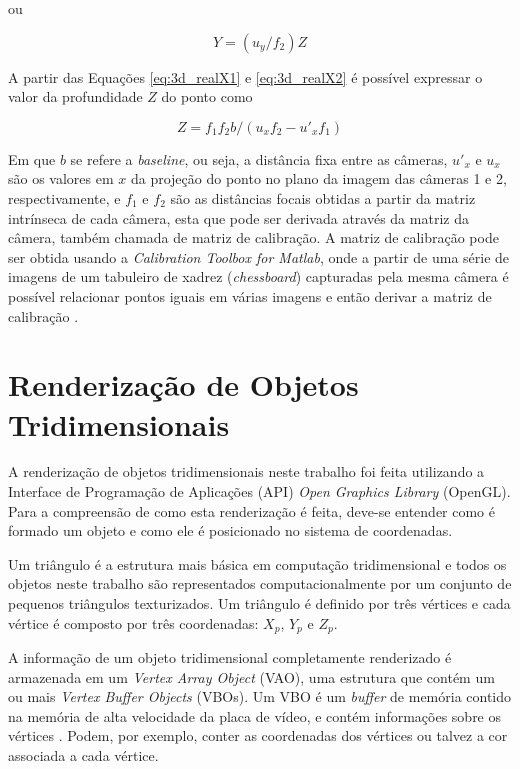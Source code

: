 {ou

\begin{equation}
Y = (u_y/f_2) Z
\label{eq:3d_realY2}
\end{equation}  


A partir das Equações \ref{eq:3d_realX1} e \ref{eq:3d_realX2} é possível expressar o valor da profundidade $Z$ do ponto como

\begin{equation}
Z = f_1  f_2  b / (u_x  f_2 - u'_x  f_1)
\label{eq:3d_Zequation}
\end{equation}


Em que $b$ se refere a \textit{baseline}, ou seja, a distância fixa entre as câmeras, $u'_x$ e $u_x$ são os valores em $x$ da projeção do ponto no plano da imagem das câmeras 1 e 2, respectivamente, e $f_1$ e $f_2$ são as distâncias focais obtidas a partir da matriz intrínseca de cada câmera, esta que pode ser derivada através da matriz da câmera, também chamada de matriz de calibração. A matriz de calibração pode ser obtida usando a \textit{Calibration Toolbox for Matlab}, onde a partir de uma série de imagens de um tabuleiro de xadrez (\textit{chessboard}) capturadas pela mesma câmera é possível relacionar pontos iguais em várias imagens e então derivar a matriz de calibração \cite{bouguetML}.

\section{Renderização de Objetos Tridimensionais}

A renderização de objetos tridimensionais neste trabalho foi feita utilizando a  Interface de Programação de Aplicações (API)  \textit{Open Graphics Library} (OpenGL). Para a compreensão de como esta renderização é feita, deve-se entender como é formado um objeto e como ele é posicionado no sistema de coordenadas. 

Um triângulo é a estrutura mais básica em computação tridimensional \cite{openGlWikibooks} e todos os objetos neste trabalho são representados computacionalmente por um conjunto de pequenos triângulos texturizados. Um triângulo é definido por três vértices e cada vértice é composto por três coordenadas: $X_p$, $Y_p$ e $Z_p$.

A informação de um objeto tridimensional completamente renderizado é armazenada em um  \textit{Vertex Array Object} (VAO), uma estrutura que contém um ou mais  \textit{Vertex Buffer Objects} (VBOs). Um VBO é um \textit{buffer} de memória contido na memória de alta velocidade da placa de vídeo, e contém informações sobre os vértices \cite{openGlOrg}. Podem, por exemplo, conter as coordenadas dos vértices ou talvez a cor associada a cada vértice.

}
